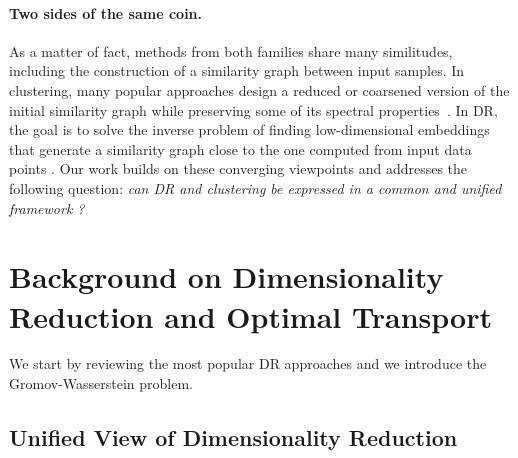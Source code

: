 \paragraph{Two sides of the same coin.} As a matter of fact, methods from both families share many similitudes, %
including the construction of a similarity graph between input samples. In clustering, many popular approaches design a reduced or coarsened version of the initial similarity graph while preserving some of its spectral properties~\cite{von2007tutorial, schaeffer2007graph}. 
In DR, the goal is to solve the inverse problem of finding low-dimensional embeddings that generate a similarity graph close to the %
one computed from input data points \cite{ham2004kernel,hinton2002stochastic}.
Our work builds on these converging viewpoints and addresses the following question: \emph{can DR and clustering  be expressed in a common and unified framework ?}




\section{Background on Dimensionality Reduction and Optimal Transport}

We start by reviewing the most popular DR approaches and we introduce the Gromov-Wasserstein problem.

\subsection{Unified View of Dimensionality Reduction \label{sec:dr_methods}}

